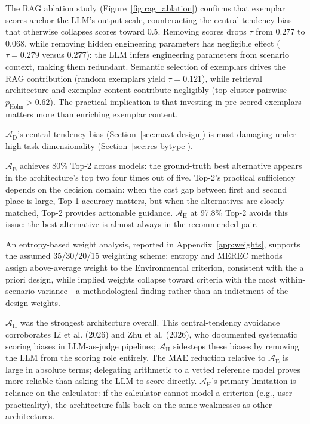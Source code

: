 \documentclass[final,3p,times]{elsarticle}
\begin{document}
The RAG ablation study (Figure~\ref{fig:rag_ablation}) confirms that exemplar scores anchor the LLM's output scale, counteracting the central-tendency bias that otherwise collapses scores toward 0.5. Removing scores drops $\tau$ from 0.277 to 0.068, while removing hidden engineering parameters has negligible effect ($\tau = 0.279$ versus 0.277): the LLM infers engineering parameters from scenario context, making them redundant. Semantic selection of exemplars drives the RAG contribution (random exemplars yield $\tau = 0.121$), while retrieval architecture and exemplar content contribute negligibly (top-cluster pairwise $p_{\text{Holm}} > 0.62$). The practical implication is that investing in pre-scored exemplars matters more than enriching exemplar content.

$\mathcal{A}_{\text{D}}$'s central-tendency bias (Section~\ref{sec:mavt-design}) is most damaging under high task dimensionality (Section~\ref{sec:res-bytype}).

$\mathcal{A}_{\text{E}}$ achieves 80\% Top-2 across models: the ground-truth best alternative appears in the architecture's top two four times out of five. Top-2's practical sufficiency depends on the decision domain: when the cost gap between first and second place is large, Top-1 accuracy matters, but when the alternatives are closely matched, Top-2 provides actionable guidance. $\mathcal{A}_{\text{H}}$ at 97.8\% Top-2 avoids this issue: the best alternative is almost always in the recommended pair.

An entropy-based weight analysis, reported in Appendix~\ref{app:weights}, supports the assumed 35/30/20/15 weighting scheme: entropy and MEREC methods assign above-average weight to the Environmental criterion, consistent with the a priori design, while implied weights collapse toward criteria with the most within-scenario variance---a methodological finding rather than an indictment of the design weights.

$\mathcal{A}_{\text{H}}$ was the strongest architecture overall. This central-tendency avoidance corroborates Li et al. (2026) and Zhu et al. (2026), who documented systematic scoring biases in LLM-as-judge pipelines; $\mathcal{A}_{\text{H}}$ sidesteps these biases by removing the LLM from the scoring role entirely. The MAE reduction relative to $\mathcal{A}_{\text{E}}$ is large in absolute terms; delegating arithmetic to a vetted reference model proves more reliable than asking the LLM to score directly. $\mathcal{A}_{\text{H}}$'s primary limitation is reliance on the calculator: if the calculator cannot model a criterion (e.g., user practicality), the architecture falls back on the same weaknesses as other architectures.
\end{document}
